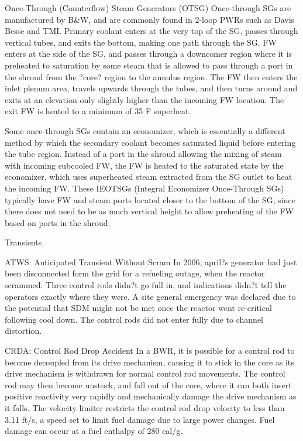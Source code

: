 \documentclass[10pt]{article}
\begin{document}
Once-Through (Counterflow) Steam Generators (OTSG)
Once-through SGs are manufactured by B\&W, and are commonly found in 2-loop PWRs such as Davis Besse and TMI. Primary coolant enters at the very top of the SG, passes through vertical tubes, and exits the bottom, making one path through the SG. FW enters at the side of the SG, and passes through a downcomer region where it is preheated to saturation by some steam that is allowed to pass through a port in the shroud from the ?core? region to the annulus region. The FW then enters the inlet plenum area, travels upwards through the tubes, and then turns around and exits at an elevation only slightly higher than the incoming FW location. The exit FW is heated to a minimum of 35 F superheat. 

Some once-through SGs contain an economizer, which is essentially a different method by which the secondary coolant becomes saturated liquid before entering the tube region. Instead of a port in the shroud allowing the mixing of steam with incoming subcooled FW, the FW is heated to the saturated state by the economizer, which uses superheated steam extracted from the SG outlet to heat the incoming FW. These IEOTSGs (Integral Economizer Once-Through SGs) typically have FW and steam ports located closer to the bottom of the SG, since there does not need to be as much vertical height to allow preheating of the FW based on ports in the shroud. 


Transients

ATWS: Anticipated Transient Without Scram
In 2006, april?s generator had just been disconnected form the grid for a refueling outage, when the reactor scrammed. Three control rods didn?t go full in, and indications didn?t tell the operators exactly where they were. A site general emergency was declared due to the potential that SDM might not be met once the reactor went re-critical following cool down. The control rods did not enter fully due to channel distortion. 

CRDA: Control Rod Drop Accident
In a BWR, it is possible for a control rod to become decoupled from its drive mechanism, causing it to stick in the core as its drive mechanism is withdrawn for normal control rod movements. The control rod may then become unstuck, and fall out of the core, where it can both insert positive reactivity very rapidly and mechanically damage the drive mechanism as it falls. The velocity limiter restricts the control rod drop velocity to less than 3.11 ft/s, a speed set to limit fuel damage due to large power changes. Fuel damage can occur at a fuel enthalpy of 280 cal/g. 
\end{document}

